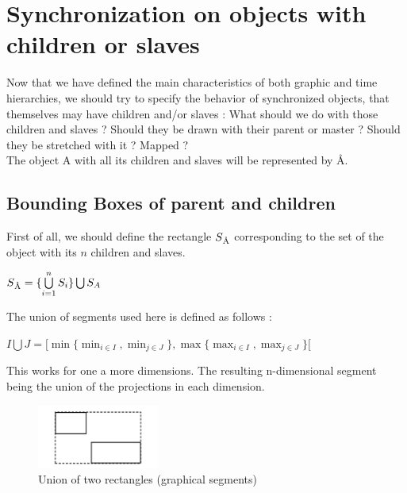 \documentclass[a4paper]{article}
\begin{document}
\section{Synchronization on objects with children or slaves}\label{sec:sync_children}


Now that we have defined the main characteristics of both graphic and time hierarchies, we should try to specify the behavior of synchronized objects, that themselves may have children and/or slaves : What should we do with those children and slaves ? Should they be drawn with their parent or master ? Should they be stretched with it ? Mapped ?
\\

The object A with all its children and slaves will be represented by \r{A}.


\subsection{Bounding Boxes of parent and children}\label{subsec:bb}

First of all, we should define the rectangle $S\textsubscript{\r{A}}$ corresponding to the set of the object with its $n$ children and slaves. 

\begin{center} $ S\textsubscript{\r{A}}  =\{ \bigcup \limits_{i=1}^n S_i \} \bigcup S_A$ \end{center}

The union of segments used here is defined as follows :

\begin{center} $I \bigcup J = [\min \{ \displaystyle{\min_{i \in I}} , \displaystyle{\min_{j \in J}} \} , \max \{ \displaystyle{\max_{i \in I}},\displaystyle{\max_{j \in J}} \} [$ \end{center}

This works for one a more dimensions. The resulting n-dimensional segment being the union of the projections in each dimension.

\begin{figure}[h]
\centering
\includegraphics[width=40mm]{img/rect.png}
\caption{Union of two rectangles (graphical segments)}
\label{fig:rectunion}
\end{figure}
\end{document}
